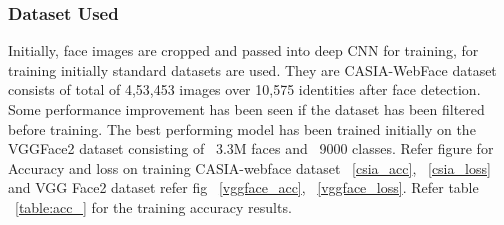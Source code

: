 \documentclass[a4paper,12pt, twoside]{NITKReport}
\begin{document}
\subsubsection{Dataset Used}
\par Initially, face images are cropped and passed into deep CNN for training, for training initially standard datasets are used. They are CASIA-WebFace dataset consists of total of 4,53,453 images over 10,575 identities after face detection. Some performance improvement has been seen if the dataset has been filtered before training. The best performing model has been trained initially on the VGGFace2 dataset consisting of ~3.3M faces and ~9000 classes. Refer figure for Accuracy and loss on training CASIA-webface dataset ~\ref{csia_acc}, ~\ref{csia_loss} and VGG Face2 dataset refer fig ~\ref{vggface_acc}, ~\ref{vggface_loss}. Refer table ~\ref{table:acc_} for the training accuracy results.
\end{document}
